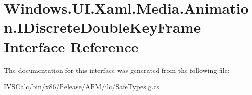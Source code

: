\hypertarget{interface_windows_1_1_u_i_1_1_xaml_1_1_media_1_1_animation_1_1_i_discrete_double_key_frame}{}\section{Windows.\+U\+I.\+Xaml.\+Media.\+Animation.\+I\+Discrete\+Double\+Key\+Frame Interface Reference}
\label{interface_windows_1_1_u_i_1_1_xaml_1_1_media_1_1_animation_1_1_i_discrete_double_key_frame}


The documentation for this interface was generated from the following file\+:\begin{DoxyCompactItemize}
\item 
I\+V\+S\+Calc/bin/x86/\+Release/\+A\+R\+M/ilc/Safe\+Types.\+g.\+cs\end{DoxyCompactItemize}
